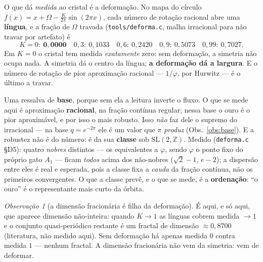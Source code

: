 \documentclass[11pt]{article}
\newcommand{\code}[1]{\texttt{\small #1}}
\newcommand{\Z}{\mathbb Z}
\theoremstyle{plain}
\theoremstyle{remark}
\newtheorem{obs}{Observação}
\begin{document}
O que dá \emph{medida} ao cristal é a deformação. No mapa do círculo
$f(x)=x+\Omega-\frac{K}{2\pi}\sin(2\pi x)$, cada número de rotação racional abre uma \textbf{língua},
e a fração de $\Omega$ travada (\code{tools/deforma.c}, malha irracional para não travar por
artefato) é
\[
 K=0:\ \mathbf{0{,}0000}\quad 0{,}3:\ 0{,}1033\quad 0{,}6:\ 0{,}2420\quad
 0{,}9:\ 0{,}5073\quad 0{,}99:\ 0{,}7027.
\]
Em $K=0$ o cristal tem medida \emph{exatamente} zero: sem deformação, a simetria não ocupa nada. A
simetria dá o centro da língua; \textbf{a deformação dá a largura}. E o número de rotação de pior
aproximação racional --- $1/\varphi$, por Hurwitz --- é o último a travar.

Uma ressalva de \textbf{base}, porque sem ela a leitura inverte o fluxo. O que se mede aqui é
aproximação \textbf{racional}, na fração contínua regular; nessa base o ouro é o pior aproximável, e
por isso o mais robusto. Isso \emph{não} faz dele o supremo do irracional --- na base $q=e^{-2\pi}$ ele
é um valor que $\pi$ \emph{produz} (Obs.~\ref{obs:base}). E a robustez não é do número: é da sua
\textbf{classe} sob $\mathrm{SL}(2,\Z)$. Medido (\code{deforma.c} §D5): quatro \emph{nobres} distintos
--- os equivalentes a $\varphi$, sendo $\varphi$ o ponto fixo do próprio gato $A_1$ --- ficam
\emph{todos} acima dos não-nobres ($\sqrt2-1$, $e-2$); a dispersão entre eles é real e esperada, pois a
classe fixa a \emph{cauda} da fração contínua, não os primeiros convergentes. O que a classe prevê, e o
que se mede, é a \textbf{ordenação}: ``o ouro'' é o representante mais curto da órbita.

\begin{obs}[a dimensão fracionária é filha da deformação]
É aqui, e só aqui, que aparece dimensão não-inteira: quando $K\to1$ as línguas cobrem medida $\to1$ e
o conjunto quasi-periódico restante é um fractal de dimensão $\approx0{,}8700$ (literatura, não medido
aqui). Sem deformação há apenas medida $0$ contra medida $1$ --- nenhum fractal. A dimensão
fracionária não vem da simetria: vem de deformar.
\end{obs}
\end{document}
